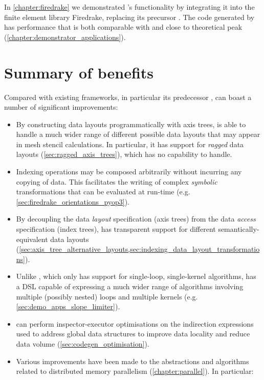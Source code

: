 \documentclass[thesis]{subfiles}
\begin{document}
In \cref{chapter:firedrake} we demonstrated 's functionality by integrating it into the finite element library Firedrake, replacing its precursor .
The code generated by  has performance that is both comparable with  and close to theoretical peak (\cref{chapter:demonstrator_applications}).

\section{Summary of benefits}

Compared with existing frameworks, in particular its predecessor ,  can boast a number of significant improvements:
\begin{itemize}
  \item
    By constructing data layouts programmatically with axis trees,  is able to handle a much wider range of different possible data layouts that may appear in mesh stencil calculations.
    In particular, it has support for \emph{ragged} data layouts (\cref{sec:ragged_axis_trees}), which  has no capability to handle.
  \item
    Indexing operations may be composed arbitrarily without incurring any copying of data.
    This facilitates the writing of complex \emph{symbolic} transformations that can be evaluated at run-time (e.g. \cref{sec:firedrake_orientations_pyop3}).
  \item
    By decoupling the data \emph{layout} specification (axis trees) from the data \emph{access} specification (index trees),  has transparent support for different semantically-equivalent data layouts (\cref{sec:axis_tree_alternative_layouts,sec:indexing_data_layout_transformations}).
  \item
    Unlike , which only has support for single-loop, single-kernel algorithms,  has a DSL capable of expressing a much wider range of algorithms involving multiple (possibly nested) loops and multiple kernels (e.g. \cref{sec:demo_apps_slope_limiter}).
  \item
     can perform inspector-executor optimisations on the indirection expressions used to address global data structures to improve data locality and reduce data volume (\cref{sec:codegen_optimisation}).
  \item
    Various improvements have been made to the abstractions and algorithms related to distributed memory parallelism (\cref{chapter:parallel}).
    In particular:
    \begin{itemize}

\end{itemize}
\end{itemize}
\end{document}
